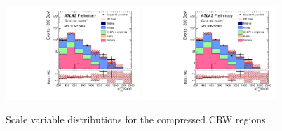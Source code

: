 \begin{figure}[tbp]
\begin{center}
\includegraphics[width=0.45\textwidth]{figures/ATLAS-CONF-2016-078_INT/N-1Plots/AtlasStyle/Preliminary/CRW_SRJigsawSRC4_LastCut_CRW_minusone}
\includegraphics[width=0.45\textwidth]{figures/ATLAS-CONF-2016-078_INT/N-1Plots/AtlasStyle/Preliminary/CRW_SRJigsawSRC5_LastCut_CRW_minusone}
\end{center}
\caption{Scale variable distributions for the compressed CRW regions}
\label{fig:CRW_SRJigsawSRC1_LastCut_CRW_minusone}
\end{figure}

